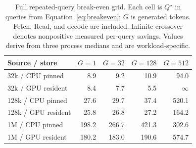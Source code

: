 \begin{table}[htbp]
\centering
\small
\setlength{\tabcolsep}{4pt}
\begin{tabular}{@{}lrrrr@{}}
\toprule
Source / store & $G=1$ & $G=32$ & $G=128$ & $G=512$ \\
\midrule
32k / CPU pinned & 8.9 & 9.2 & 10.9 & 94.0 \\
32k / GPU resident & 8.4 & 7.7 & 5.5 & $\infty$ \\
128k / CPU pinned & 27.6 & 29.7 & 37.4 & 520.1 \\
128k / GPU resident & 25.8 & 26.8 & 27.2 & 164.2 \\
1M / CPU pinned & 198.2 & 266.7 & 421.3 & 302.6 \\
1M / GPU resident & 180.2 & 183.0 & 190.6 & 574.7 \\
\bottomrule
\end{tabular}
\caption{Full repeated-query break-even grid. Each cell is $Q^\star$ in queries from Equation~\ref{eq:breakeven}; $G$ is generated tokens. Fetch, Read, and decode are included. Infinite crossover denotes nonpositive measured per-query savings. Values derive from three process medians and are workload-specific.}
\label{tab:break-even}
\end{table}
